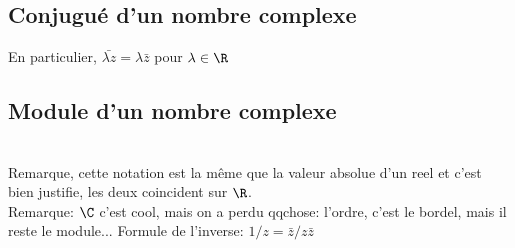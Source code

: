 \documentclass[a4paper]{article}
\begin{document}
\subsection{Conjugu\'e d'un nombre complexe}
\label{sec:conj}
En particulier, $\bar{\lambda z}=\lambda \bar{z}$ pour $\lambda \in \R$\\

\subsection{Module d'un nombre complexe}
\\

Remarque, cette notation est la m\^eme que la valeur absolue d'un reel
et c'est bien justifie, les deux coincident sur $\R$.
\\

Remarque: $\C$ c'est cool, mais on a perdu qqchose: l'ordre, c'est le
bordel, mais il reste le module...
Formule de l'inverse: $1/z=\bar{z}/z\bar{z}$


\end{document}
